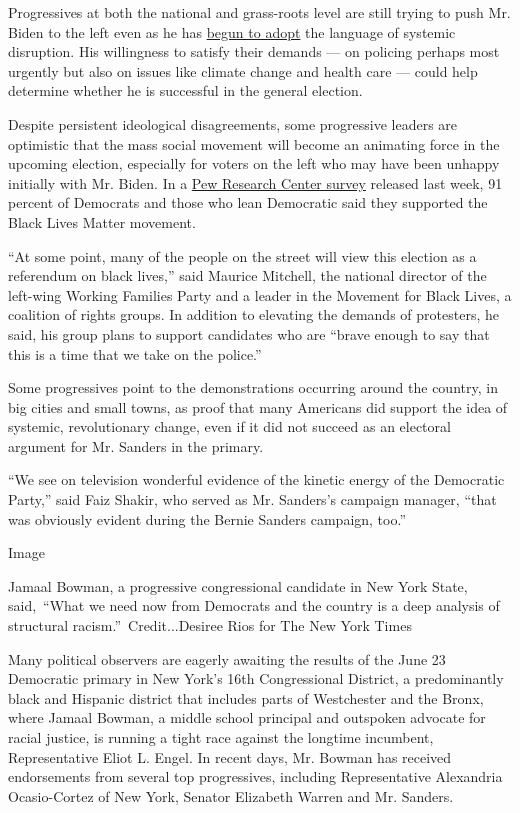 Progressives at both the national and grass-roots level are still trying
to push Mr. Biden to the left even as he has
\href{https://www.nytimes3xbfgragh.onion/2020/05/13/us/politics/joe-biden-trump.html}{begun
to adopt} the language of systemic disruption. His willingness to
satisfy their demands --- on policing perhaps most urgently but also on
issues like climate change and health care --- could help determine
whether he is successful in the general election.

Despite persistent ideological disagreements, some progressive leaders
are optimistic that the mass social movement will become an animating
force in the upcoming election, especially for voters on the left who
may have been unhappy initially with Mr. Biden. In a
\href{https://www.pewsocialtrends.org/2020/06/12/amid-protests-majorities-across-racial-and-ethnic-groups-express-support-for-the-black-lives-matter-movement/}{Pew
Research Center survey} released last week, 91 percent of Democrats and
those who lean Democratic said they supported the Black Lives Matter
movement.

``At some point, many of the people on the street will view this
election as a referendum on black lives,'' said Maurice Mitchell, the
national director of the left-wing Working Families Party and a leader
in the Movement for Black Lives, a coalition of rights groups. In
addition to elevating the demands of protesters, he said, his group
plans to support candidates who are ``brave enough to say that this is a
time that we take on the police.''

Some progressives point to the demonstrations occurring around the
country, in big cities and small towns, as proof that many Americans did
support the idea of systemic, revolutionary change, even if it did not
succeed as an electoral argument for Mr. Sanders in the primary.

``We see on television wonderful evidence of the kinetic energy of the
Democratic Party,'' said Faiz Shakir, who served as Mr. Sanders's
campaign manager, ``that was obviously evident during the Bernie Sanders
campaign, too.''

Image

Jamaal Bowman, a progressive congressional candidate in New York State,
said,~``What we need now from Democrats and the country is a deep
analysis of structural racism.''~Credit...Desiree Rios for The New York
Times

Many political observers are eagerly awaiting the results of the June 23
Democratic primary in New York's 16th Congressional District, a
predominantly black and Hispanic district that includes parts of
Westchester and the Bronx, where Jamaal Bowman, a middle school
principal and outspoken advocate for racial justice, is running a tight
race against the longtime incumbent, Representative Eliot L. Engel. In
recent days, Mr. Bowman has received endorsements from several top
progressives, including Representative Alexandria Ocasio-Cortez of New
York, Senator Elizabeth Warren and Mr. Sanders.

